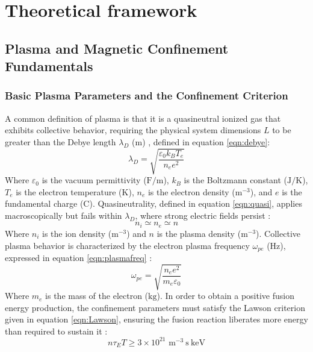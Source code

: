 \newpage 
\section{Theoretical framework}

\subsection{Plasma and Magnetic Confinement Fundamentals}

\subsubsection{Basic Plasma Parameters and the Confinement Criterion}
A common definition of plasma is that it is a quasineutral ionized gas that exhibits collective behavior, requiring the physical system dimensions $L$ to be greater than the Debye length $\lambda_D$ ($\text{m}$) \cite{chen2016introduction}, defined in equation \ref{eqn:debye}:
\begin{equation}
\label{eqn:debye}
    \lambda_D = \sqrt{\frac{\varepsilon_0 k_B T_e}{n_e e^2}}
\end{equation}
Where $\varepsilon_0$ is the vacuum permittivity ($\text{F/m}$), $k_B$ is the Boltzmann constant ($\text{J/K}$), $T_e$ is the electron temperature ($\text{K}$), $n_e$ is the electron density ($\text{m}^{-3}$), and $e$ is the fundamental charge ($\text{C}$). Quasineutrality, defined in equation \ref{eqn:quasi}, applies macroscopically but fails within $\lambda_D$, where strong electric fields persist \cite{chen2016introduction}:
\begin{equation}
    \label{eqn:quasi}
    n_i \simeq n_e \simeq n
\end{equation}
Where $n_i$ is the ion density ($\text{m}^{-3}$) and $n$ is the plasma density ($\text{m}^{-3}$). Collective plasma behavior is characterized by the electron plasma frequency $\omega_{pe}$ ($\text{Hz}$), expressed in equation \ref{eqn:plasmafreq} \cite{chen2016introduction}:
\begin{equation}
    \label{eqn:plasmafreq}
    \omega_{pe} = \sqrt{\frac{n_e e^2}{m_e \varepsilon_0}}
\end{equation}
Where $m_e$ is the mass of the electron ($\text{kg}$). In order to obtain a positive fusion energy production, the confinement parameters must satisfy the Lawson criterion given in equation \ref{eqn:Lawson}, ensuring the fusion reaction liberates more energy than required to sustain it \cite{chen2016introduction}:
\begin{equation}
\label{eqn:Lawson}
n \tau_E T \ge 3 \times 10^{21} \text{ m}^{-3}\ \text{s}\ \text{keV}
\end{equation}
